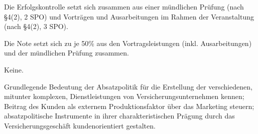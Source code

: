 \begin{course}

\setdoclanguagegerman
{}



\coursehead


\label{cour_6747.dp_997}


\begin{styleenv}
\begin{assessment}
Die Erfolgskontrolle setzt sich zusammen aus einer mündlichen Prüfung (nach §4(2), 2 SPO) und Vorträgen und Ausarbeitungen im Rahmen der Veranstaltung (nach §4(2), 3 SPO).

 

Die Note setzt sich zu je 50\% aus den Vortragsleistungen (inkl. Ausarbeitungen) und der mündlichen Prüfung zusammen.


\end{assessment}

\begin{conditions}Keine.\end{conditions}


\end{styleenv}

\begin{learningoutcomes}
Grundlegende Bedeutung der Absatzpolitik für die Erstellung der verschiedenen, mitunter komplexen, Dienstleistungen von Versicherungsunternehmen kennen; Beitrag des Kunden als externem Produktionsfaktor über das Marketing steuern; absatzpolitische Instrumente in ihrer charakteristischen Prägung durch das Versicherungsgeschäft kundenorientiert gestalten.


\end{learningoutcomes}


\end{course}
